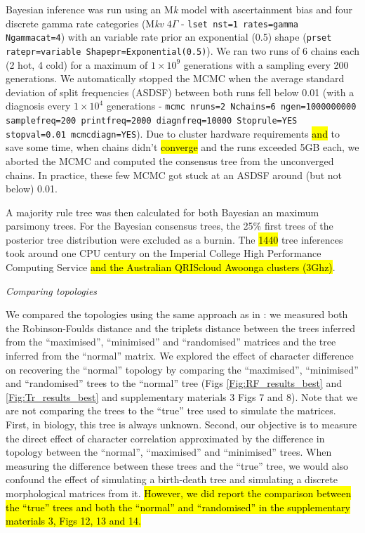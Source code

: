 \documentclass[12pt,letterpaper]{article}
\renewcommand{\subsection}[1]{%
\bigskip
\begin{center}
\begin{large}
\normalfont\itshape #1
\end{large}
\end{center}}
\begin{document}
Bayesian inference was run using an M\textit{k} model with ascertainment bias and four discrete gamma rate categories (M\textit{kv} $4\Gamma$ - \texttt{lset nst=1 rates=gamma Ngammacat=4}) with an variable rate prior an exponential (0.5) shape (\texttt{prset ratepr=variable Shapepr=Exponential(0.5)}).
We ran two runs of 6 chains each (2 hot, 4 cold) for a maximum of $1\times10^9$ generations with a sampling every 200 generations.
We automatically stopped the MCMC when the average standard deviation of split frequencies (ASDSF) between both runs fell below 0.01 (with a diagnosis every $1\times10^4$ generations - \texttt{mcmc nruns=2 Nchains=6 ngen=1000000000 samplefreq=200 printfreq=2000 diagnfreq=10000 Stoprule=YES stopval=0.01 mcmcdiagn=YES}).
Due to cluster hardware requirements \hl{and} to save some time, when chains didn't \hl{converge} and the runs exceeded 5GB each, we aborted the MCMC and computed the consensus tree from the unconverged chains.
In practice, these few MCMC got stuck at an ASDSF around (but not below) 0.01.

A majority rule tree was then calculated for both Bayesian an maximum parsimony trees.
For the Bayesian consensus trees, the 25\% first trees of the posterior tree distribution were excluded as a burnin.
The \hl{1440} tree inferences took around one CPU century on the Imperial College High Performance Computing Service \citep[2-3GHz clock rate;][]{HPC} \hl{and the Australian QRIScloud Awoonga clusters (3Ghz)}.

\subsection{Comparing topologies}
We compared the topologies using the same approach as in \cite{Guillerme2016146}: we measured both the Robinson-Foulds distance \citep{RF1981} and the triplets distance \citep{dobson1975triplets} between the trees inferred from the ``maximised'', ``minimised'' and ``randomised'' matrices and the tree inferred from the ``normal'' matrix.
We explored the effect of character difference on recovering the ``normal'' topology by comparing the ``maximised'', ``minimised'' and ``randomised'' trees to the ``normal'' tree (Figs \ref{Fig:RF_results_best} and \ref{Fig:Tr_results_best} and supplementary materials 3 Figs 7 and 8).
Note that we are not comparing the trees to the ``true'' tree used to simulate the matrices.
First, in biology, this tree is always unknown.
Second, our objective is to measure the direct effect of character correlation approximated by the difference in topology between the ``normal'', ``maximised'' and ``minimised'' trees.
When measuring the difference between these trees and the ``true'' tree, we would also confound the effect of simulating a birth-death tree and simulating a discrete morphological matrices from it.
\hl{However, we did report the comparison between the ``true'' trees and both the ``normal'' and ``randomised'' in the supplementary materials 3, Figs 12, 13 and 14.}
\end{document}
